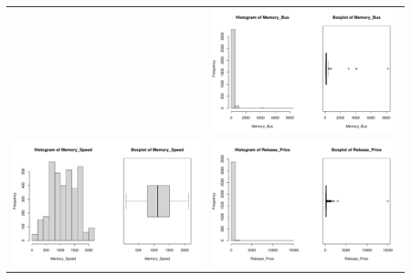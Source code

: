 \documentclass[a4paper]{article}
\theoremstyle{definition}
\begin{document}
\begin{center}
\begin{adjustbox}{width=\textwidth}
\begin{tabular}{cc}
        &\includegraphics[keepaspectratio, width=1\textwidth, height=1\textheight]{Visualization/Rplot_6.pdf}\\
        \includegraphics[keepaspectratio, width=1\textwidth, height=1\textheight]{Visualization/Rplot_7.pdf}
        &\includegraphics[keepaspectratio, width=1\textwidth, height=1\textheight]{Visualization/Rplot_8.pdf}\\
    \end{tabular}
\end{adjustbox}
\end{center}
\end{document}
